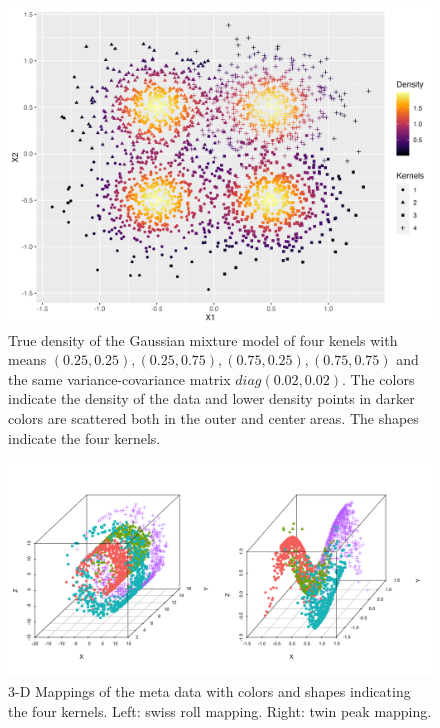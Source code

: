 \documentclass[11pt,a4paper,]{article}
\begin{document}
\begin{figure}

{\centering \includegraphics[width=0.8\linewidth]{figures/truedensity_4kernels} 

}

\caption{True density of the Gaussian mixture model of four kenels with means $(0.25, 0.25), (0.25, 0.75), (0.75, 0.25), (0.75, 0.75)$ and the same variance-covariance matrix $diag(0.02, 0.02)$. The colors indicate the density of the data and lower density points in darker colors are scattered both in the outer and center areas. The shapes indicate the four kernels.}\label{fig:metadensity}
\end{figure}

\begin{figure}

{\centering \includegraphics[width=0.8\linewidth]{figures/mappings_sr_tp} 

}

\caption{3-D Mappings of the meta data with colors and shapes indicating the four kernels. Left: swiss roll mapping. Right: twin peak mapping.}\label{fig:mappings}
\end{figure}
\end{document}
